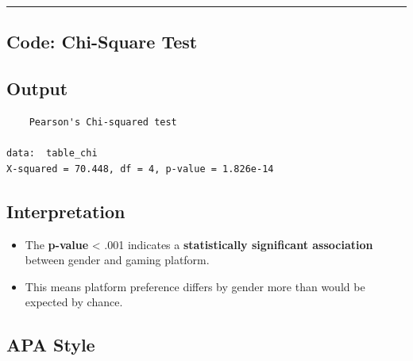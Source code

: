 \documentclass[
]{book}
\newenvironment{Shaded}{\begin{snugshade}}{\end{snugshade}}
\newcommand{\CommentTok}[1]{\textcolor[rgb]{0.56,0.35,0.01}{\textit{#1}}}
\newcommand{\FunctionTok}[1]{\textcolor[rgb]{0.13,0.29,0.53}{\textbf{#1}}}
\newcommand{\NormalTok}[1]{#1}
\newcommand{\OtherTok}[1]{\textcolor[rgb]{0.56,0.35,0.01}{#1}}
\newcommand{\SpecialCharTok}[1]{\textcolor[rgb]{0.81,0.36,0.00}{\textbf{#1}}}
\providecommand{\tightlist}{%
  \setlength{\itemsep}{0pt}\setlength{\parskip}{0pt}}
\begin{document}
\begin{center}\rule{0.5\linewidth}{0.5pt}\end{center}

\subsection{Code: Chi-Square Test}\label{code-chi-square-test}

\begin{Shaded}
\end{Shaded}

\subsection{Output}\label{output}

\begin{verbatim}
    Pearson's Chi-squared test

data:  table_chi
X-squared = 70.448, df = 4, p-value = 1.826e-14
\end{verbatim}

\subsection{Interpretation}\label{interpretation-1}

\begin{itemize}
\tightlist
\item
  The \textbf{p-value} \textless{} .001 indicates a \textbf{statistically significant association} between gender and gaming platform.
\item
  This means platform preference differs by gender more than would be expected by chance.
\end{itemize}

\subsection{APA Style}\label{apa-style}
\end{document}
